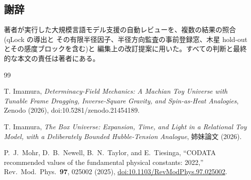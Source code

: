 \documentclass[a4paper,10pt,twocolumn]{ltjsarticle}
\begin{document}
\subsection*{謝辞}
著者が実行した大規模言語モデル支援の自動レビューを、複数の結果の照合(qLock の導出と
その有限半径因子、半径方向監査の事前登録窓、木星 hold-out とその感度ブロックを含む)と
編集上の改訂提案に用いた。すべての判断と最終的な本文の責任は著者にある。

\begin{thebibliography}{99}

 T. Imamura, \emph{Determinacy-Field Mechanics: A
Machian Toy Universe with Tunable Frame Dragging, Inverse-Square
Gravity, and Spin-as-Heat Analogies}, Zenodo (2026),
doi:10.5281/zenodo.21454189.

 T. Imamura, \emph{The Box Universe: Expansion, Time,
and Light in a Relational Toy Model, with a Deliberately Bounded
Hubble-Tension Analogue}, 姉妹論文 (2026).



P.~J.~Mohr, D.~B.~Newell, B.~N.~Taylor, and E.~Tiesinga,
``CODATA recommended values of the fundamental physical constants:
2022,'' Rev.\ Mod.\ Phys.\ \textbf{97}, 025002 (2025),
\href{https://doi.org/10.1103/RevModPhys.97.025002}
{doi:10.1103/RevModPhys.97.025002}.


\end{thebibliography}
\end{document}
